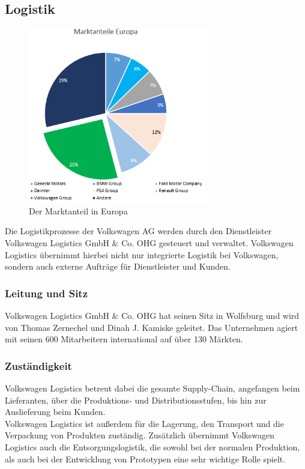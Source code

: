 \documentclass[12pt]{article}
\begin{document}
\subsection{Logistik}
\begin{figure}[here!]
	\centering
	\includegraphics[width=0.7\textwidth]{images/maie}
	\caption{Der Marktanteil in Europa}
	\label{fig:markteuropa}
\end{figure}\FloatBarrier
Die Logistikprozesse der Volkswagen AG werden durch den Dienstleister Volkswagen Logistics GmbH \& Co. OHG gesteuert und verwaltet.
Volkswagen Logistics übernimmt hierbei nicht nur integrierte Logistik bei Volkswagen, sondern auch externe Aufträge für Dienstleister und Kunden.

\subsubsection{Leitung und Sitz}
Volkswagen Logistics GmbH \& Co. OHG hat seinen Sitz in Wolfsburg und wird von Thomas Zernechel und Dinah J. Kamiske geleitet.
Das Unternehmen agiert mit seinen 600 Mitarbeitern international auf über 130 Märkten.

\subsubsection{Zuständigkeit}
Volkswagen Logistics betreut dabei die gesamte Supply-Chain, angefangen beim Lieferanten, über die Produktions- und Distributionsstufen, bis hin zur Auslieferung beim Kunden.\\
Volkswagen Logistics ist außerdem für die Lagerung, den Transport und die Verpackung von Produkten zuständig. Zusätzlich übernimmt Volkswagen Logistics auch die Entsorgungslogistik, die sowohl bei der normalen Produktion, als auch bei der Entwicklung von Prototypen eine sehr wichtige Rolle spielt.
\end{document}
